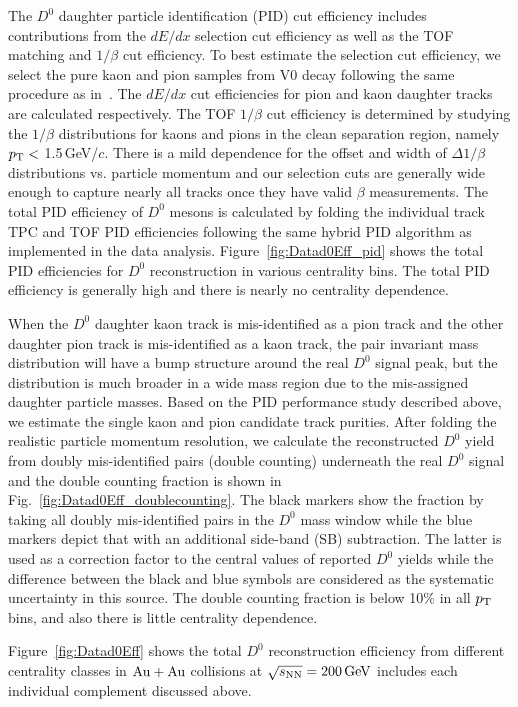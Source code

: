\documentclass[%
 reprint,	
 amsmath,amssymb,
 aps,
 prc,
]{revtex4-1}
\begin{document}
The $D^0$ daughter particle identification (PID) cut efficiency includes contributions from the $dE/dx$ selection cut efficiency as well as the TOF matching and $1/\beta$ cut efficiency. To best estimate the selection cut efficiency, we select the pure kaon and pion samples from V0 decay following the same procedure as in~\cite{Shao:2005iu,Xu:2008th}. The $dE/dx$ cut efficiencies for pion and kaon daughter tracks are calculated respectively. The TOF $1/\beta$ cut efficiency is determined by studying the $1/\beta$ distributions for kaons and pions in the clean separation region, namely $p_{\rm T}<$ 1.5\,GeV/$c$. There is a mild dependence for the offset and width of $\Delta 1/\beta$ distributions vs. particle momentum and our selection cuts are generally wide enough to capture nearly all tracks once they have valid $\beta$ measurements. The total PID efficiency of $D^0$ mesons is calculated by folding the individual track TPC and TOF PID efficiencies following the same hybrid PID algorithm as implemented in the data analysis. Figure~\ref{fig:Datad0Eff_pid} shows the total PID efficiencies for $D^0$ reconstruction in various centrality bins. The total PID efficiency is generally high and there is nearly no centrality dependence.

When the $D^0$ daughter kaon track is mis-identified as a pion track and the other daughter pion track is mis-identified as a kaon track, the pair invariant mass distribution will have a bump structure around the real $D^0$ signal peak, but the distribution is much broader in a wide mass region due to the mis-assigned daughter particle masses. Based on the PID  performance study described above, we estimate the single kaon and pion candidate track purities. After folding the realistic particle momentum resolution, we calculate the reconstructed $D^0$ yield from doubly mis-identified pairs (double counting) underneath the real $D^0$ signal and the double counting fraction is shown in Fig.~\ref{fig:Datad0Eff_doublecounting}. The black markers show the fraction by taking all doubly mis-identified pairs in the $D^0$ mass window while the blue markers depict that with an additional side-band (SB) subtraction. The latter is used as a correction factor to the central values of reported $D^0$ yields while the difference between the black and blue symbols are considered as the systematic uncertainty in this source. The double counting fraction is below 10\% in all $p_{\rm T}$ bins, and also there is little centrality dependence.

Figure~\ref{fig:Datad0Eff} shows the total $D^{0}$ reconstruction efficiency from different centrality classes in ${\rm{Au + Au}}$ collisions at ${\sqrt{s_{\rm NN}} = \rm{200\,GeV}}$ includes each individual complement discussed above.
\end{document}

